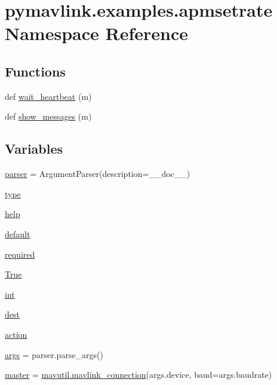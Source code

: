 \hypertarget{namespacepymavlink_1_1examples_1_1apmsetrate}{}\section{pymavlink.\+examples.\+apmsetrate Namespace Reference}
\label{namespacepymavlink_1_1examples_1_1apmsetrate}
\subsection*{Functions}
\begin{DoxyCompactItemize}
\item 
def \mbox{\hyperlink{namespacepymavlink_1_1examples_1_1apmsetrate_a7411701774159f385cda1fd908922db8}{wait\+\_\+heartbeat}} (m)
\item 
def \mbox{\hyperlink{namespacepymavlink_1_1examples_1_1apmsetrate_a81e07c39f713646c60c7a22474c50b3f}{show\+\_\+messages}} (m)
\end{DoxyCompactItemize}
\subsection*{Variables}
\begin{DoxyCompactItemize}
\item 
\mbox{\hyperlink{namespacepymavlink_1_1examples_1_1apmsetrate_a9220578b8e15a0a37d32b26f3da427c4}{parser}} = Argument\+Parser(description=\+\_\+\+\_\+doc\+\_\+\+\_\+)
\item 
\mbox{\hyperlink{namespacepymavlink_1_1examples_1_1apmsetrate_a6ddec302ac765bf4507deaeac82a9742}{type}}
\item 
\mbox{\hyperlink{namespacepymavlink_1_1examples_1_1apmsetrate_ae8a6327ada7faeb472130ecdce104581}{help}}
\item 
\mbox{\hyperlink{namespacepymavlink_1_1examples_1_1apmsetrate_a2db28a2885d7359979121c13d7bd7c2e}{default}}
\item 
\mbox{\hyperlink{namespacepymavlink_1_1examples_1_1apmsetrate_a683c2a204848ddfee318149314790dfd}{required}}
\item 
\mbox{\hyperlink{namespacepymavlink_1_1examples_1_1apmsetrate_aa54a6631d98e57dda89237a6b61feca3}{True}}
\item 
\mbox{\hyperlink{namespacepymavlink_1_1examples_1_1apmsetrate_aeb3bfdbda45b3c1181d5de2f09faef7d}{int}}
\item 
\mbox{\hyperlink{namespacepymavlink_1_1examples_1_1apmsetrate_a0610d1cb2ff9cf82c33f096070ddf7ac}{dest}}
\item 
\mbox{\hyperlink{namespacepymavlink_1_1examples_1_1apmsetrate_a0fc32ac97d6ceb898143319f6021332c}{action}}
\item 
\mbox{\hyperlink{namespacepymavlink_1_1examples_1_1apmsetrate_a68b17ae8dfbe9bc451937dccb22205e4}{args}} = parser.\+parse\+\_\+args()
\item 
\mbox{\hyperlink{namespacepymavlink_1_1examples_1_1apmsetrate_a04860ab120e9f285b98b4210cce0cb25}{master}} = \mbox{\hyperlink{namespacepymavlink_1_1mavutil_aa6c4b8861f86ef3bb746fa0fab241c93}{mavutil.\+mavlink\+\_\+connection}}(args.\+device, baud=args.\+baudrate)
\end{DoxyCompactItemize}


